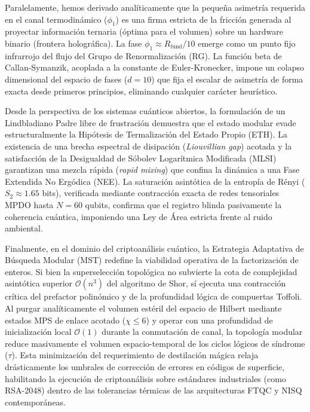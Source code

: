\documentclass[12pt,a4paper]{article}
\theoremstyle{plain}
\theoremstyle{definition}
\theoremstyle{remark}
\begin{document}
Paralelamente, hemos derivado analíticamente que la pequeña asimetría requerida en el canal termodinámico ($\phi_1$) es una firma estricta de la fricción generada al proyectar información ternaria (óptima para el volumen) sobre un hardware binario (frontera holográfica). La fase $\phi_1 \approx R_{\text{fund}}/10$ emerge como un punto fijo infrarrojo del flujo del Grupo de Renormalización (RG). La función beta de Callan-Symanzik, acoplada a la constante de Euler-Kronecker, impone un colapso dimensional del espacio de fases ($d=10$) que fija el escalar de asimetría de forma exacta desde primeros principios, eliminando cualquier carácter heurístico.

Desde la perspectiva de los sistemas cuánticos abiertos, la formulación de un Lindbladiano Padre libre de frustración demuestra que el estado modular evade estructuralmente la Hipótesis de Termalización del Estado Propio (ETH). La existencia de una brecha espectral de disipación (\textit{Liouvillian gap}) acotada y la satisfacción de la Desigualdad de Sóbolev Logarítmica Modificada (MLSI) garantizan una mezcla rápida (\textit{rapid mixing}) que confina la dinámica a una Fase Extendida No Ergódica (NEE). La saturación asintótica de la entropía de Rényi ($S_2 \approx 1.65$ bits), verificada mediante contracción exacta de redes tensoriales MPDO hasta $N=60$ qubits, confirma que el registro blinda pasivamente la coherencia cuántica, imponiendo una Ley de Área estricta frente al ruido ambiental.

Finalmente, en el dominio del criptoanálisis cuántico, la Estrategia Adaptativa de Búsqueda Modular (MST) redefine la viabilidad operativa de la factorización de enteros. Si bien la superselección topológica no subvierte la cota de complejidad asintótica superior $\mathcal{O}(n^3)$ del algoritmo de Shor, sí ejecuta una contracción crítica del prefactor polinómico y de la profundidad lógica de compuertas Toffoli. Al purgar analíticamente el volumen estéril del espacio de Hilbert mediante estados MPS de enlace acotado ($\chi \le 6$) y operar con una profundidad de inicialización local $\mathcal{O}(1)$ durante la conmutación de canal, la topología modular reduce masivamente el volumen espacio-temporal de los ciclos lógicos de síndrome ($\tau$). Esta minimización del requerimiento de destilación mágica relaja drásticamente los umbrales de corrección de errores en códigos de superficie, habilitando la ejecución de criptoanálisis sobre estándares industriales (como RSA-2048) dentro de las tolerancias térmicas de las arquitecturas FTQC y NISQ contemporáneas.
\end{document}
